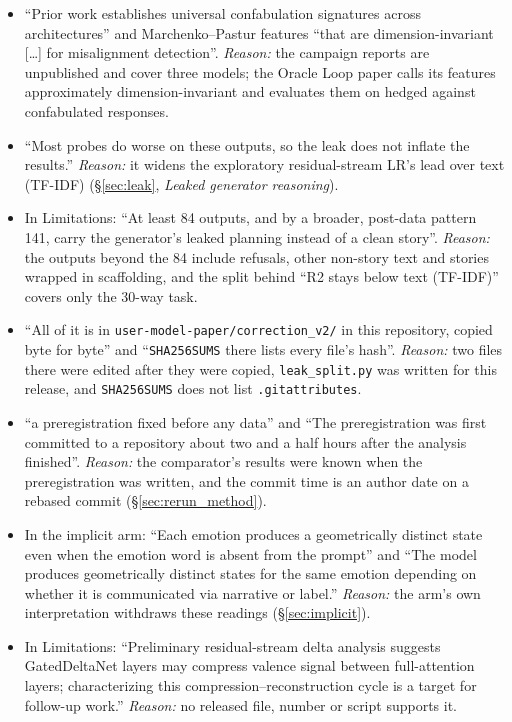 \documentclass[11pt,a4paper]{article}
\begin{document}
\begin{enumerate}[leftmargin=*]
\begin{itemize}[nosep]
        \item ``Prior work establishes universal confabulation signatures across architectures'' and Marchenko--Pastur features ``that are dimension-invariant [\ldots] for misalignment detection''. \emph{Reason:} the campaign reports are unpublished and cover three models; the Oracle Loop paper calls its features approximately dimension-invariant and evaluates them on hedged against confabulated responses.
        \item ``Most probes do worse on these outputs, so the leak does not inflate the results.'' \emph{Reason:} it widens the exploratory residual-stream LR's lead over text (TF-IDF) (\S\ref{sec:leak}, \emph{Leaked generator reasoning}).
        \item In Limitations: ``At least 84 outputs, and by a broader, post-data pattern 141, carry the generator's leaked planning instead of a clean story''. \emph{Reason:} the outputs beyond the 84 include refusals, other non-story text and stories wrapped in scaffolding, and the split behind ``R2 stays below text (TF-IDF)'' covers only the 30-way task.
        \item ``All of it is in \texttt{user-model-paper/correction\_v2/} in this repository, copied byte for byte'' and ``\texttt{SHA256SUMS} there lists every file's hash''. \emph{Reason:} two files there were edited after they were copied, \texttt{leak\_split.py} was written for this release, and \texttt{SHA256SUMS} does not list \texttt{.gitattributes}.
        \item ``a preregistration fixed before any data'' and ``The preregistration was first committed to a repository about two and a half hours after the analysis finished''. \emph{Reason:} the comparator's results were known when the preregistration was written, and the commit time is an author date on a rebased commit (\S\ref{sec:rerun_method}).
        \item In the implicit arm: ``Each emotion produces a geometrically distinct state even when the emotion word is absent from the prompt'' and ``The model produces geometrically distinct states for the same emotion depending on whether it is communicated via narrative or label.'' \emph{Reason:} the arm's own interpretation withdraws these readings (\S\ref{sec:implicit}).
        \item In Limitations: ``Preliminary residual-stream delta analysis suggests GatedDeltaNet layers may compress valence signal between full-attention layers; characterizing this compression--reconstruction cycle is a target for follow-up work.'' \emph{Reason:} no released file, number or script supports it.

\end{itemize}
\end{enumerate}
\end{document}
